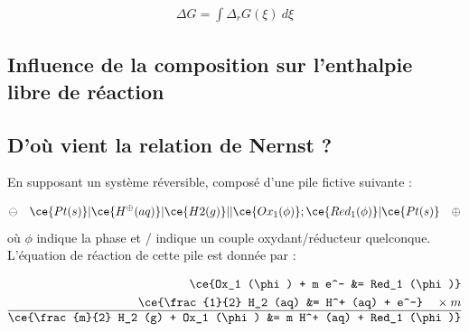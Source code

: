\begin{align*}
\Delta G = \int \Delta_r G ( \xi ) ~ d \xi
\end{align*}

\subsection{Influence de la composition sur l'enthalpie libre de réaction}



\subsection{D'où vient la relation de Nernst ?}

En supposant un système réversible, composé d'une pile fictive suivante : 

\begin{equation}
\ominus \quad \ce{Pt (s)} | \ce{H^\oplus (aq)} | \ce{H2 (g)} ||  \ce{Ox_1 (\phi)}; \ce{Red_1 (\phi)} | \ce{Pt (s)} \quad \oplus
\label{eq:pileOxRedvsESH}
\end{equation}
où $\phi$ indique la phase et / indique un couple oxydant/réducteur quelconque. L'équation de réaction de cette pile est donnée par : 

\begin{center}
\begin{minipage}{0.4\textwidth}
\begin{align*}
\ce{Ox_1 (\phi) + m e^- &= Red_1 (\phi)} \\
\ce{\frac{1}{2} H_2 (aq) &= H^+ (aq) + e^-} \quad \times m \\
\hline
\ce{\frac{m}{2} H_2 (g) + Ox_1 (\phi) &= m H^+ (aq) + Red_1 (\phi)}
\end{align*}
\end{minipage}
\end{center}

